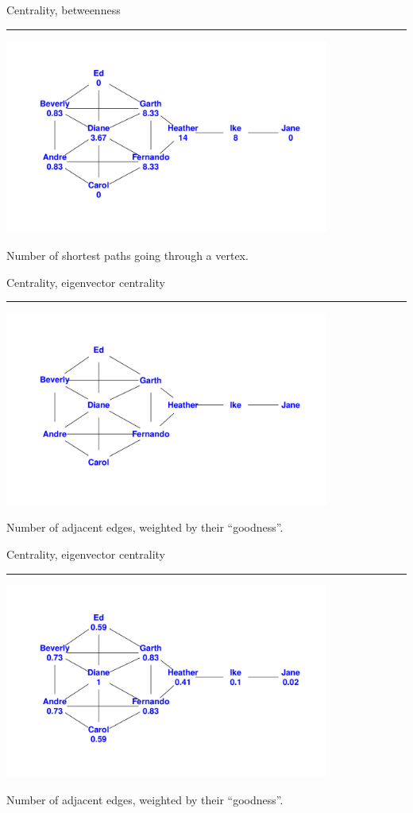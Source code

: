 \documentclass[landscape,fleqno]{foils}
\newcommand{\stitle}[1]{{\color{blue}\Large #1\par\vspace*{10pt}\hrule}}
\begin{document}
\newpage
\stitle{Centrality, betweenness}
\begin{center}
\includegraphics[width=0.8\textwidth]{centnet-betweenness}
\par Number of shortest paths going through a vertex.
\end{center}

\newpage
\stitle{Centrality, eigenvector centrality}
\begin{center}
\includegraphics[width=0.8\textwidth]{centnet}
\par Number of adjacent edges, weighted by their ``goodness''.
\end{center}

\newpage
\stitle{Centrality, eigenvector centrality}
\begin{center}
\includegraphics[width=0.8\textwidth]{centnet-evcent}
\par Number of adjacent edges, weighted by their ``goodness''.
\end{center}
\end{document}
